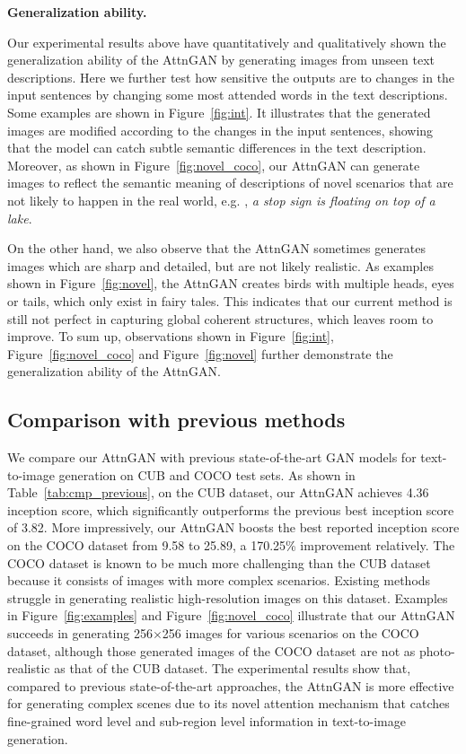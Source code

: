 \textbf{Generalization ability. }{ Our experimental results above have quantitatively and qualitatively shown the generalization ability of the AttnGAN by generating images from unseen text descriptions. Here we further test how sensitive the outputs are to changes in the input sentences by changing some most attended words in the text descriptions. Some examples are shown in Figure~\ref{fig:int}. It illustrates that the generated images are modified according to the changes in the input sentences, showing that the model can catch subtle semantic differences in the text description. Moreover, as shown in Figure~\ref{fig:novel_coco}, our AttnGAN can generate images to reflect the semantic meaning of descriptions of novel scenarios that are not likely to happen in the real world, e.g. , \textit{a stop sign is floating on top of a lake}. 

On the other hand, we also observe that the AttnGAN sometimes generates images which are sharp and detailed, but are not likely realistic. As examples shown in Figure~\ref{fig:novel}, the AttnGAN creates birds with multiple heads, eyes or tails, which only exist in fairy tales. This indicates that our current method is still not perfect in capturing global coherent structures, which leaves room to improve. To sum up, observations shown in Figure~\ref{fig:int}, Figure~\ref{fig:novel_coco} and Figure~\ref{fig:novel} further demonstrate the generalization ability of the AttnGAN. 

}

\subsection{Comparison with previous methods} \label{sec:compare}

We compare our AttnGAN with previous state-of-the-art GAN models for text-to-image generation on CUB and COCO test sets. As shown in Table~\ref{tab:cmp_previous}, on the CUB dataset, our AttnGAN achieves 4.36 inception score, which significantly outperforms the previous best inception score of 3.82. More impressively, our AttnGAN boosts the best reported inception score on the COCO dataset from 9.58 to 25.89, a 170.25\% improvement relatively. The COCO dataset is known to be much more challenging than the CUB dataset because it consists of images with more complex scenarios. Existing methods struggle in generating realistic high-resolution images on this dataset. Examples in Figure~\ref{fig:examples} and Figure~\ref{fig:novel_coco} illustrate that our AttnGAN succeeds in generating 256$\times$256 images for various scenarios on the COCO dataset, although those generated images of the COCO dataset are not as photo-realistic as that of the CUB dataset. The experimental results show that, compared to previous state-of-the-art approaches, the AttnGAN is more effective for generating complex scenes due to its novel attention mechanism that catches fine-grained word level and sub-region level information in text-to-image generation.  

